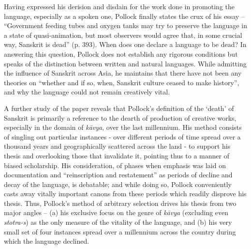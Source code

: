 Having expressed his derision and disdain for the work done in promoting the language, especially as a spoken one, Pollock finally states the crux of his essay – “Government feeding tubes and oxygen tanks may try to preserve the language in a state of quasi-animation, but most observers would agree that, in some crucial way, Sanskrit is dead” (p. 393). When does one declare a language to be dead? In answering this question, Pollock does not establish any rigorous conditions but speaks of the distinction between written and natural languages. While admitting the influence of Sanskrit across Asia, he maintains that there have not been any theories on “whether and if so, when, Sanskrit culture ceased to make history”, and why the language could not remain creatively vital.

A further study of the paper reveals that Pollock’s definition of the ‘death’ of Sanskrit is primarily a reference to the dearth of production of creative works, especially in the domain of {\sl kāvya}, over the last millennium. His method consists of singling out particular instances - over different periods of time spread over a thousand years and geographically scattered across the land - to support his thesis and overlooking those that invalidate it, pointing thus to a manner of biased scholarship. His consideration, of phases when emphasis was laid on documentation and “reinscription and restatement” as periods of decline and decay of the language, is debatable; and while doing so, Pollock conveniently casts away vitally important canons from these periods which readily disprove his thesis. Thus, Pollock’s method of arbitrary selection drives his thesis from two major angles – (a) his exclusive focus on the genre of {\sl kāvya} (excluding even {\sl stotra-s}) as the only measure of the vitality of the language, and (b) his very small set of four instances spread over a millennium across the country during which the language declined.

